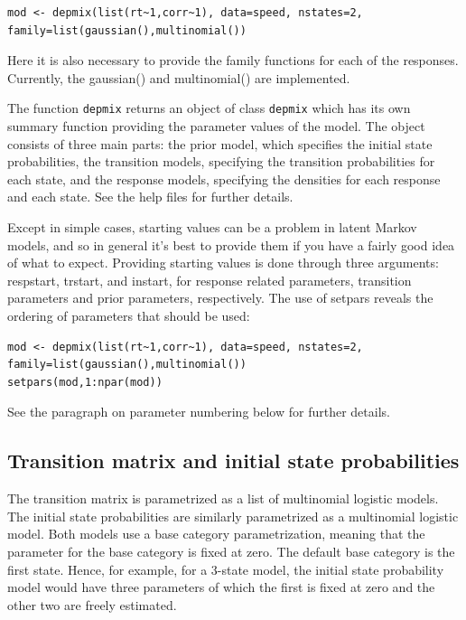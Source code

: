 \documentclass[a4paper]{article}
\newcommand{\code}{\texttt}
\begin{document}
\begin{verbatim} 
mod <- depmix(list(rt~1,corr~1), data=speed, nstates=2, 
family=list(gaussian(),multinomial())
\end{verbatim}

Here it is also necessary to provide the family functions for each of
the responses.  Currently, the gaussian() and multinomial() are
implemented. 

The function \code{depmix} returns an object of class \code{depmix}
which has its own summary function providing the parameter values of
the model. The object consists of three main parts: the prior model,
which specifies the initial state probabilities, the transition
models, specifying the transition probabilities for each state, and
the response models, specifying the densities for each response and
each state. See the help files for further details.  

Except in simple cases, starting values can be a problem in latent
Markov models, and so in general it's best to provide them if you have
a fairly good idea of what to expect.  Providing starting values is
done through three arguments: respstart, trstart, and instart, for
response related parameters, transition parameters and prior
parameters, respectively.  The use of setpars reveals the ordering of
parameters that should be used:

\begin{verbatim}
mod <- depmix(list(rt~1,corr~1), data=speed, nstates=2, 
family=list(gaussian(),multinomial())
setpars(mod,1:npar(mod))
\end{verbatim}

See the paragraph on parameter numbering below for further details.


\subsection{Transition matrix and initial state probabilities}

The transition matrix is parametrized as a list of multinomial
logistic models.  The initial state probabilities are similarly
parametrized as a multinomial logistic model.  Both models use a base
category parametrization, meaning that the parameter for the base
category is fixed at zero.  The default base category is the first
state.  Hence, for example, for a 3-state model, the initial state
probability model would have three parameters of which the first is
fixed at zero and the other two are freely estimated.
\end{document}
